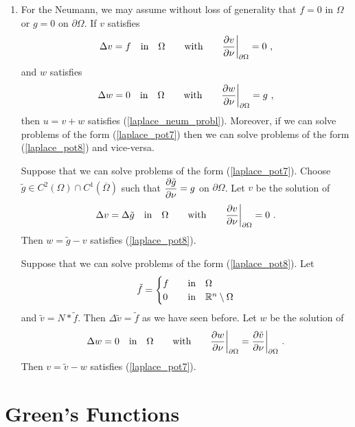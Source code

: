 \begin{enumerate}
\item For the Neumann, we may assume without loss of generality that
$f=0$ in $\Omega$ or $g=0$ on $\partial \Omega$.
If $v$ satisfies
\begin{equation} \label{laplace_pot7}
\Delta v = f \quad \text{in} \quad \Omega \qquad \text{with}
\qquad \frac{\partial{v}}{\partial \nu}\bigg|_{\partial \Omega} = 0 \ ,
\end{equation}
and $w$ satisfies
\begin{equation} \label{laplace_pot8}
\Delta w = 0 \quad \text{in} \quad \Omega \qquad \text{with}
\qquad \frac{\partial{w}}{\partial \nu}\bigg|_{\partial \Omega} = g \ ,
\end{equation}
then $u=v+w$ satisfies (\ref{laplace_neum_probl}).  Moreover, if we
can solve problems of the form (\ref{laplace_pot7}) then we can solve
problems of the form (\ref{laplace_pot8}) and vice-versa.

Suppose that we can solve problems of the form (\ref{laplace_pot7}).
Choose
$\displaystyle \tilde{g} \in C^2(\Omega) \cap C^1(\overline{\Omega})$ such that
$\displaystyle \frac{\partial{\tilde{g}}}{\partial \nu} = g$ on $\partial \Omega$.
Let $v$ be the solution of
\[
\Delta v = \Delta \tilde{g} \quad \text{in} \quad \Omega \qquad \text{with}
\qquad \frac{\partial{v}}{\partial \nu}\bigg|_{\partial \Omega} = 0 \ .
\]
Then $w=\tilde{g}-v$ satisfies (\ref{laplace_pot8}).

Suppose that we can solve problems of the form (\ref{laplace_pot8}).
Let
\[
\tilde{f} =
\begin{cases}
f & \quad \text{in} \quad \Omega \\
0 & \quad \text{in} \quad \mathbb{R}^n\setminus \Omega
\end{cases}
\]
and $\tilde{v} = N\ast \tilde{f}$.  Then
$\displaystyle \Delta \tilde{v} = \tilde{f}$ as we have seen before.
Let $w$ be the solution of
\[
\Delta w = 0 \quad \text{in} \quad \Omega \qquad \text{with}
\qquad \frac{\partial{w}}{\partial \nu}\bigg|_{\partial \Omega} =
\frac{\partial{\tilde{v}}}{\partial \nu}\bigg|_{\partial \Omega} \ .
\]
Then $v=\tilde{v}-w$ satisfies (\ref{laplace_pot7}).
\end{enumerate}

\section{Green's Functions}

